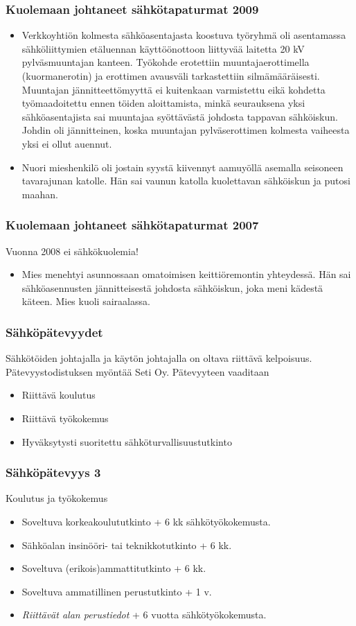 \begin{frame}
\frametitle{Kuolemaan johtaneet sähkötapaturmat 2009}
\begin{itemize}
\item Verkkoyhtiön kolmesta sähköasentajasta koostuva työryhmä oli asentamassa sähköliittymien etäluennan käyttöönottoon liittyvää laitetta 20 kV pylväsmuuntajan kanteen. Työkohde erotettiin muuntajaerottimella (kuormanerotin) ja erottimen avausväli tarkastettiin silmämääräisesti. Muuntajan jännitteettömyyttä ei kuitenkaan varmistettu eikä kohdetta työmaadoitettu ennen töiden aloittamista, minkä seurauksena yksi sähköasentajista sai muuntajaa syöttävästä johdosta tappavan sähköiskun. Johdin oli jännitteinen, koska muuntajan pylväserottimen kolmesta vaiheesta yksi ei ollut auennut.

\item  Nuori mieshenkilö oli jostain syystä kiivennyt aamuyöllä asemalla seisoneen tavarajunan katolle. Hän sai vaunun katolla kuolettavan sähköiskun ja putosi maahan.
\end{itemize}
\end{frame}

\begin{frame}
\frametitle{Kuolemaan johtaneet sähkötapaturmat 2007}
Vuonna 2008 ei sähkökuolemia!
\begin{itemize}
\item Mies menehtyi asunnossaan omatoimisen keittiöremontin yhteydessä. Hän sai sähköasennusten jännitteisestä johdosta sähköiskun, joka meni kädestä käteen. Mies kuoli sairaalassa.
\end{itemize}
\end{frame}


\begin{frame}
\frametitle{Sähköpätevyydet}
Sähkötöiden johtajalla ja käytön johtajalla on oltava riittävä kelpoisuus. Pätevyystodistuksen myöntää Seti Oy. Pätevyyteen vaaditaan
\begin{itemize}
\item Riittävä koulutus
\item Riittävä työkokemus
\item Hyväksytysti suoritettu sähköturvallisuustutkinto
\end{itemize}
\end{frame}

\begin{frame}
\frametitle{Sähköpätevyys 3}
Koulutus ja työkokemus
\begin{itemize}
\item Soveltuva korkeakoulututkinto + 6 kk sähkötyökokemusta.
\item Sähköalan insinööri- tai teknikkotutkinto + 6 kk.
\item Soveltuva (erikois)ammattitutkinto + 6 kk.
\item Soveltuva ammatillinen perustutkinto + 1 v.
\item {\em Riittävät alan perustiedot} + 6 vuotta sähkötyökokemusta.
\end{itemize}
\end{frame}

